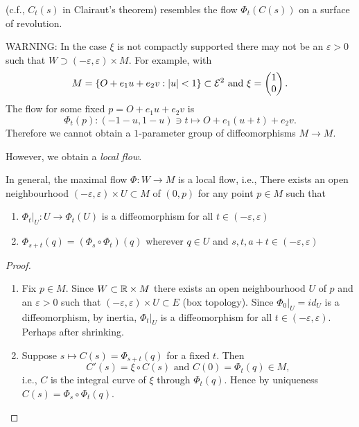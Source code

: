 \begin{remark}
	(c.f., $C_t(s)$ in Clairaut's theorem) resembles the flow $\Phi_t(C(s))$ on a surface of revolution.
\end{remark}

WARNING: In the case $\xi$ is not compactly supported there may not be an $\varepsilon>0$ such that $W \supset (-\varepsilon,\varepsilon) \times M$. For example, with
	\[ M= \{ O+e_1u + e_2v : \left| u\right|<1 \} \subset \mathcal E^2 \text{ and } \xi = \begin{pmatrix} 1\\0 \end{pmatrix}. \]
The flow for some fixed $p= O+e_1u +e_2v$ is 
	\[ \Phi_t(p): (-1-u, 1-u) \ni t \mapsto O+e_1(u+t)+e_2 v. \]
Therefore we cannot obtain a $1$-parameter group of diffeomorphisms $M \to M$.

However, we obtain a \emph{local flow}.
	
\begin{remark}
	In general, the maximal flow $\Phi : W \to M$ is a local flow, i.e., There exists an open neighbourhood $(-\varepsilon , \varepsilon) \times U \subset M$ of $(0,p)$ for any point $p \in M$ such that
	\begin{enumerate}
		\item $\Phi_t |_{U}: U \to \Phi_t(U)$ is a diffeomorphism for all $t \in (-\varepsilon,\varepsilon)$
		\item $\Phi_{s+t}(q) = (\Phi_s \circ \Phi_t)(q)$ wherever $q \in U$ and $s,t,a+t \in (-\varepsilon,\varepsilon)$
	\end{enumerate}
\end{remark} 

\begin{proof}
	\begin{enumerate}
		\item Fix $p \in M$. Since $W \subset \mathbb R \times M$ there exists an open neighbourhood $U$ of $p$ and an $\varepsilon>0$ such that $(-\varepsilon,\varepsilon) \times U \subset E$ (box topology). Since $\Phi_0 |_{U} = id_U$ is a diffeomorphism, by inertia, $\Phi_t|_U$ is a diffeomorphism for all $t \in (-\varepsilon,\varepsilon)$. Perhaps after shrinking.
		
		\item Suppose $s \mapsto C(s)= \Phi_{s+t}(q)$ for a fixed $t$. Then 
		\[ C'(s) = \xi \circ C(s)\text{ and } C(0)=\Phi_t(q) \in M, \]
		i.e., $C$ is the integral curve of $\xi$ through $\Phi_t(q)$. Hence by uniqueness $C(s)=\Phi_s\circ \Phi_t(q)$.
	\end{enumerate}
\end{proof}

